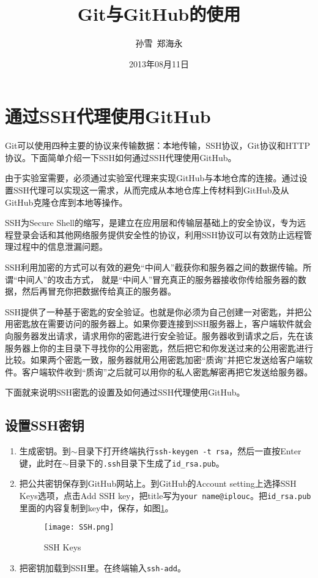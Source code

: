 \documentclass[a4paper,12pt]{article}
\author{孙雪\ 郑海永}  %
\title{Git与GitHub的使用} %
\date{2013年08月11日}
\begin{document}

\maketitle
\tableofcontents
\newpage
\section{通过SSH代理使用GitHub}

Git可以使用四种主要的协议来传输数据：本地传输，SSH协议，Git协议和HTTP协议。下面简单介绍一下SSH如何通过SSH代理使用GitHub。

由于实验室需要，必须通过实验室代理来实现GitHub与本地仓库的连接。通过设置SSH代理可以实现这一需求，从而完成从本地仓库上传材料到GitHub及从GitHub克隆仓库到本地等操作。

SSH为Secure Shell的缩写，是建立在应用层和传输层基础上的安全协议，专为远程登录会话和其他网络服务提供安全性的协议，利用SSH协议可以有效防止远程管理过程中的信息泄漏问题。

SSH利用加密的方式可以有效的避免“中间人”截获你和服务器之间的数据传输。所谓“中间人”的攻击方式， 就是“中间人”冒充真正的服务器接收你传给服务器的数据，然后再冒充你把数据传给真正的服务器。

SSH提供了一种基于密匙的安全验证。也就是你必须为自己创建一对密匙，并把公用密匙放在需要访问的服务器上。如果你要连接到SSH服务器上，客户端软件就会向服务器发出请求，请求用你的密匙进行安全验证。服务器收到请求之后，先在该服务器上你的主目录下寻找你的公用密匙，然后把它和你发送过来的公用密匙进行比较。如果两个密匙一致，服务器就用公用密匙加密“质询”并把它发送给客户端软件。客户端软件收到“质询”之后就可以用你的私人密匙解密再把它发送给服务器。

下面就来说明SSH密匙的设置及如何通过SSH代理使用GitHub。

\subsection{设置SSH密钥}

\begin{enumerate}
\item 生成密钥。到$\sim$目录下打开终端执行\lstinline|ssh-keygen -t rsa|，然后一直按Enter键，此时在$\sim$目录下的\verb|.ssh|目录下生成了\verb|id_rsa.pub|。
\item 把公共密钥保存到GitHub网站上。到GitHub的Account setting上选择SSH Keys选项，点击Add SSH key，把title写为\verb|your name@iplouc|。把\verb|id_rsa.pub|里面的内容复制到key中，保存，如图\ref{fig:2}。
\begin{figure}[!htb] %
\centering
\texttt{[image: SSH.png]}
\caption{SSH Keys}\label{fig:2}
\end{figure}
\item 把密钥加载到SSH里。在终端输入\lstinline|ssh-add|。
\end{enumerate}
\end{document}
